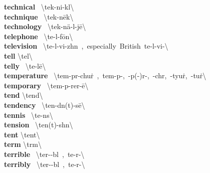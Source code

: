 \documentclass[10pt,a4paper]{article}
\begin{document}
\begin{multicols}{2}
\textbf{ technical }\quad \ \textbackslash \textprimstress tek-ni-k\textschwa l\textbackslash \\
\textbf{ technique }\quad \ \textbackslash tek-\textprimstress n\={e}k\textbackslash \\
\textbf{ technology }\quad \ \textbackslash tek-\textprimstress n\"{a}-l\textschwa -j\={e}\textbackslash \\
\textbf{ telephone }\quad \ \textbackslash \textprimstress te-l\textschwa -\textsecstress f\={o}n\textbackslash \\
\textbf{ television }\quad \ \textbackslash \textprimstress te-l\textschwa -\textsecstress vi-zh\textschwa n\ ,\ especially\ British\ \textsecstress te-l\textschwa -\textprimstress vi-\textbackslash \\
\textbf{ tell }\quad \textbackslash \textprimstress tel\textbackslash \\
\textbf{ telly }\quad \ \textbackslash \textprimstress te-l\={e}\textbackslash \\
\textbf{ temperature }\quad \ \textbackslash \textprimstress tem-p\textschwa r-\textsecstress chu\. r\ ,\ \textprimstress tem-p\textschwa -,\ -p(\textschwa -)r\textschwa -,\ -ch\textschwa r,\ -\textsecstress tyu\. r,\ -\textsecstress tu\. r\textbackslash \\
\textbf{ temporary }\quad \ \textbackslash \textprimstress tem-p\textschwa -\textsecstress rer-\={e}\textbackslash \\
\textbf{ tend }\quad \textbackslash \textprimstress tend\textbackslash \\
\textbf{ tendency }\quad \ \textbackslash \textprimstress ten-d\textschwa n(t)-s\={e}\textbackslash \\
\textbf{ tennis }\quad \ \textbackslash \textprimstress te-n\textschwa s\textbackslash \\
\textbf{ tension }\quad \ \textbackslash \textprimstress ten(t)-sh\textschwa n\textbackslash \\
\textbf{ tent }\quad \textbackslash \textprimstress tent\textbackslash \\
\textbf{ term }\quad \textbackslash \textprimstress t\textschwa rm\textbackslash \\
\textbf{ terrible }\quad \ \textbackslash \textprimstress ter-\textschwa -b\textschwa l\ ,\ \textprimstress te-r\textschwa -\textbackslash \\
\textbf{ terribly }\quad \ \textbackslash \textprimstress ter-\textschwa -b\textschwa l\ ,\ \textprimstress te-r\textschwa -\textbackslash \\

\end{multicols}
\end{document}
